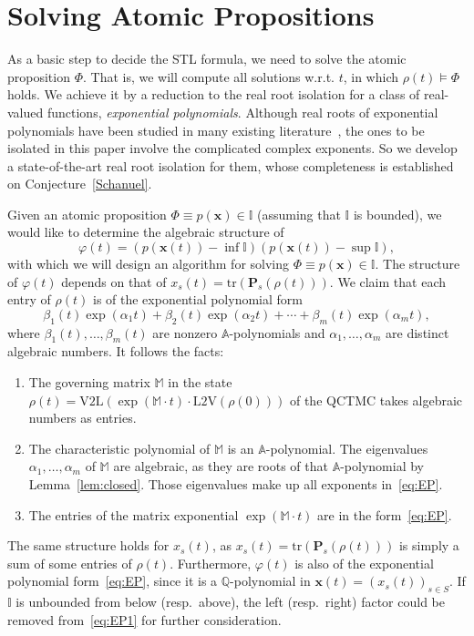 \documentclass[a4paper,UKenglish,cleveref,autoref,thm-restate,authorcolumns]{lipics-v2019}
\newcommand{\II}{\mathbb{I}}
\newcommand{\M}{\mathds{M}}
\newcommand{\PP}{\mathbf{P}}
\newcommand{\vl}{\mathrm{V2L}}
\newcommand{\lv}{\mathrm{L2V}}
\newcommand{\tr}{\mathrm{tr}}
\newcommand{\x}{\mathbf{x}}
\begin{document}
\section{Solving Atomic Propositions}\label{S5}
As a basic step to decide the STL formula,
we need to solve the atomic proposition $\Phi$.
That is,
we will compute all solutions w.r.t. $t$, in which $\rho(t) \models \Phi$ holds.
We achieve it by a reduction to the real root isolation
for a class of real-valued functions, \emph{exponential polynomials}.
Although real roots of exponential polynomials have been studied
in many existing literature~\cite{AMW08,COW16,HLX+18},
the ones to be isolated in this paper involve the complicated complex exponents.
So we develop a state-of-the-art real root isolation for them,
whose completeness is established on Conjecture~\ref{Schanuel}.

Given an atomic proposition $\Phi\equiv p(\x) \in \II$
(assuming that $\II$ is bounded),
we would like to determine the algebraic structure of
\begin{equation}\label{eq:EP1}
	\varphi(t)=(p(\x(t))-\inf\II)(p(\x(t))-\sup\II),
\end{equation}
with which we will design an algorithm for solving $\Phi\equiv p(\x) \in \II$.
The structure of $\varphi(t)$ depends on that of $x_s(t)=\tr(\PP_s(\rho(t)))$.
We claim that
each entry of $\rho(t)$ is of the exponential polynomial form
\begin{equation}\label{eq:EP}
	\beta_1(t) \exp(\alpha_1 t) + \beta_2(t) \exp(\alpha_2 t) + \cdots
	+ \beta_m(t) \exp(\alpha_m t),
\end{equation}
where $\beta_1(t),\ldots,\beta_m(t)$ are nonzero $\mathbb{A}$-polynomials
and $\alpha_1,\ldots,\alpha_m$ are distinct algebraic numbers.
It follows the facts:
\begin{enumerate}
	\item The governing matrix $\M$
		in the state $\rho(t)=\vl(\exp(\M\cdot t)\cdot\lv(\rho(0)))$ of the QCTMC
		takes algebraic numbers  as entries. 
	\item The characteristic polynomial of $\M$ is an $\mathbb{A}$-polynomial.
	    The eigenvalues $\alpha_1,\ldots,\alpha_m$ of $\M$ are algebraic,
	    as they are roots of that $\mathbb{A}$-polynomial by Lemma~\ref{lem:closed}.
		Those eigenvalues make up all exponents in~\eqref{eq:EP}.
	\item The entries of the matrix exponential $\exp(\M\cdot t)$ are in the form~\eqref{eq:EP}.
\end{enumerate}
The same structure holds for $x_s(t)$,
as $x_s(t)=\tr(\PP_s(\rho(t)))$ is simply a sum of some entries of $\rho(t)$.
Furthermore, $\varphi(t)$ is also of the exponential polynomial form~\eqref{eq:EP},
since it is a $\mathbb{Q}$-polynomial in $\x(t)=(x_s(t))_{s \in S}$.
If $\II$ is unbounded from below (resp.~above),
the left (resp.~right) factor could be removed from~\eqref{eq:EP1} for further consideration.
\end{document}
